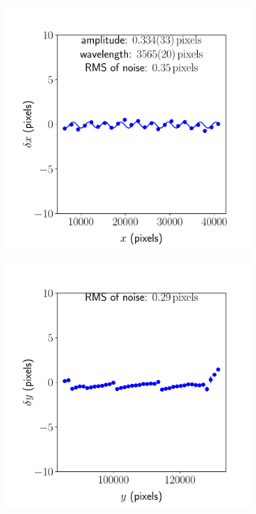 \documentclass{article}
\begin{document}
\begin{figure}[ht]
	\centering
	\begin{subfigure}{0.49\linewidth}
		\includegraphics[width=\linewidth]{sine-wave-xx-AKY}
		\caption{}
		\label{fig:sinewavexxAKY}
	\end{subfigure}
	\begin{subfigure}{0.49\linewidth}
		\includegraphics[width=\linewidth]{sine-wave-yy-AKY}

\end{subfigure}
\end{figure}
\end{document}
